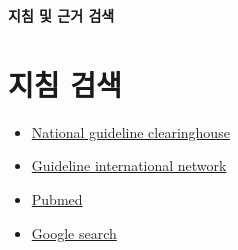 \documentclass{paper}
\begin{document}
\Large \textbf{지침 및 근거 검색} \normalsize

\section{지침 검색}
\begin{itemize}
	\item \href{http://www.guideline.gov}{National guideline clearinghouse}
	\item  \href{http://www.g-i-n.net}{Guideline international network}
	\item \href{https://www.ncbi.nlm.nih.gov/pubmed/}{Pubmed}
	\item \href{https://www.google.co.kr}{Google search}
\end{itemize}

 
\end{document}
